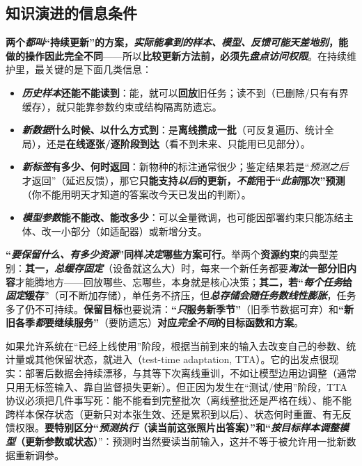 \subsection{知识演进的信息条件}
\label{sec:ket-overview-information}

\textbf{两个\emph{都叫}“持续更新”的方案，\emph{实际能拿到的样本、模型、反馈可能\emph{天差地别}}，能做的操作因此完全不同}——所以\textbf{比较更新方法前，必须先\emph{盘点访问权限}}。在持续维护里，最关键的是下面几类信息：
\begin{itemize}\item \textbf{\emph{历史样本}还能不能读到}：能，就可以\textbf{回放}旧任务；读不到（已删除/只有有界缓存），就只能靠参数约束或结构隔离防遗忘。\item \textbf{\emph{新数据}什么时候、以什么方式到}：是\textbf{离线攒成一批}（可反复遍历、统计全局），还是\textbf{在线逐张/逐阶段到达}（看不到未来、只能用已见部分）。\item \textbf{\emph{新标签}有多少、何时返回}：新物种的标注通常很少；鉴定结果若是“\emph{预测之后}才返回”（延迟反馈），那它\textbf{只能支持\emph{以后}的更新，\emph{不能}用于“\emph{此前}那次”预测}（你不能用明天才知道的答案改今天已发出的判断）。\item \textbf{\emph{模型参数}能不能改、能改多少}：可以全量微调，也可能因部署约束只能冻结主体、改一小部分（如适配器）或新增分支。\end{itemize}

\textbf{“\emph{要保留什么、有多少资源}”同样\emph{决定}哪些方案可行}。举两个\textbf{资源约束}的典型差别：\textbf{其一，\emph{总缓存固定}}（设备就这么大）时，每来一个新任务都要\textbf{\emph{淘汰}一部分旧内容}才能腾地方——回放哪些、忘哪些，本身就是核心决策；\textbf{其二，若“\emph{每个任务}给\emph{固定}缓存}”（可不断加存储），单任务不挤压，但\textbf{\emph{总存储会随任务数\emph{线性膨胀}}}，任务多了仍不可持续。\textbf{保留目标}也要说清：\textbf{“\emph{只}服务新季节”}（旧季节数据可弃）和\textbf{“新旧各季\emph{都}要继续服务”}（要防遗忘）\textbf{对应\emph{完全不同}的目标函数和方案}。

如果允许系统在“已经上线使用”阶段，根据当前到来的输入去改变自己的参数、统计量或其他保留状态，就进入（test-time adaptation, TTA）。它的出发点很现实：部署后数据会持续漂移，与其等下次离线重训，不如让模型边用边调整（通常只用无标签输入、靠自监督损失更新）。但正因为发生在“测试/使用”阶段，TTA 协议必须把几件事写死：能不能看到完整批次（离线整批还是严格在线）、能不能跨样本保存状态（更新只对本张生效、还是累积到以后）、状态何时重置、有无反馈权限。\textbf{要特别区分“\emph{预测执行}（读当前这张照片出答案）”和“\emph{按目标样本调整模型}（更新参数或状态）}”：预测时当然要读当前输入，这并不等于被允许用一批新数据重新调参。


